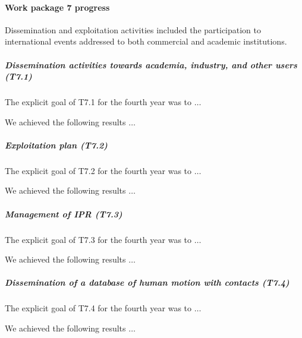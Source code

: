 

\paragraph{Work package 7 progress}

Dissemination and exploitation activities included the participation to international events addressed to both commercial and academic institutions. 

\subparagraph{Dissemination activities towards academia, industry, and other users (T7.1)}

The explicit goal of T7.1 for the fourth year was to $\dots$

We achieved the following results $\dots$

\subparagraph{Exploitation plan (T7.2)}

The explicit goal of T7.2 for the fourth year was to $\dots$

We achieved the following results $\dots$

\subparagraph{Management of IPR (T7.3)}

The explicit goal of T7.3 for the fourth year was to $\dots$

We achieved the following results $\dots$

\subparagraph{Dissemination of a database of human motion with contacts (T7.4)}

The explicit goal of T7.4 for the fourth year was to $\dots$

We achieved the following results $\dots$
